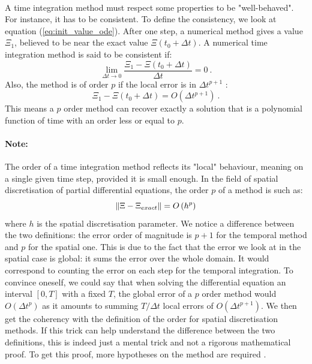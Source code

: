         \paragraph{}
        A time integration method must respect some properties to be "well-behaved".
        For instance, it has to be consistent.
        To define the consistency, we look at equation (\ref{eq:init_value_ode}).
        After one step, a numerical method gives a value $\Xi_1$, believed to be near the exact value $\Xi\left(t_0 + \Delta t\right)$.
        A numerical time integration method is said to be consistent if:
        \begin{equation}
          \lim_{\Delta t \rightarrow 0} \frac{\Xi_1 - \Xi\left(t_0 + \Delta t\right)}{\Delta t} = 0 \ .
        \end{equation}
        Also, the method is of order $p$ if the local error is in $\Delta t^{p+1}$ \cite{Iserles2008}:
        \begin{equation}
          \Xi_1 - \Xi\left(t_0 + \Delta t\right) = O\left(\Delta t^{p+1}\right) \ .
        \end{equation}
        This means a $p$ order method can recover exactly a solution that is a polynomial function of time with an order less or equal to $p$.

        \paragraph{Note:}
        The order of a time integration method reflects its "local" behaviour, meaning on a single given time step, provided it is small enough.
        In the field of spatial discretisation of partial differential equations, the order $p$ of a method is such as:
        \begin{equation}
          \norm{\Xi - \Xi_{exact}} = O\left(h^p\right)
        \end{equation}
        where $h$ is the spatial discretisation parameter.
        We notice a difference between the two definitions: the error order of magnitude is $p+1$ for the temporal method and $p$ for the spatial one.
        This is due to the fact that the error we look at in the spatial case is global: it sums the error over the whole domain.
        It would correspond to counting the error on each step for the temporal integration.
        To convince oneself, we could say that when solving the differential equation  an interval $\left[0, T\right]$ with a fixed $T$, the global error of a $p$ order method would  $O\left(\Delta t^p\right)$ as it amounts to summing $T/\Delta t$ local errors of $O\left(\Delta t^{p+1}\right)$.
        We then get the coherency with the definition of the order for spatial discretisation methods.
        If this trick can help understand the difference between the two definitions, this is indeed just a mental trick and not a rigorous mathematical proof.
        To get this proof, more hypotheses on the method are required \cite{Iserles2008}.


